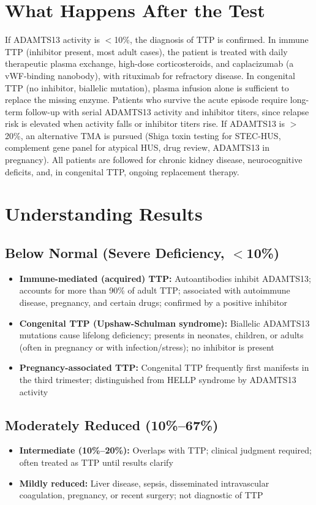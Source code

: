 \section*{What Happens After the Test}
If ADAMTS13 activity is $<$10\%, the diagnosis of TTP is confirmed. In immune TTP (inhibitor present, most adult cases), the patient is treated with daily therapeutic plasma exchange, high-dose corticosteroids, and caplacizumab (a vWF-binding nanobody), with rituximab for refractory disease. In congenital TTP (no inhibitor, biallelic mutation), plasma infusion alone is sufficient to replace the missing enzyme. Patients who survive the acute episode require long-term follow-up with serial ADAMTS13 activity and inhibitor titers, since relapse risk is elevated when activity falls or inhibitor titers rise. If ADAMTS13 is $>$20\%, an alternative TMA is pursued (Shiga toxin testing for STEC-HUS, complement gene panel for atypical HUS, drug review, ADAMTS13 in pregnancy). All patients are followed for chronic kidney disease, neurocognitive deficits, and, in congenital TTP, ongoing replacement therapy.

\section*{Understanding Results}

\subsection*{Below Normal (Severe Deficiency, $<$10\%)}
\begin{itemize}
  \item \textbf{Immune-mediated (acquired) TTP:} Autoantibodies inhibit ADAMTS13; accounts for more than 90\% of adult TTP; associated with autoimmune disease, pregnancy, and certain drugs; confirmed by a positive inhibitor
  \item \textbf{Congenital TTP (Upshaw-Schulman syndrome):} Biallelic ADAMTS13 mutations cause lifelong deficiency; presents in neonates, children, or adults (often in pregnancy or with infection/stress); no inhibitor is present
  \item \textbf{Pregnancy-associated TTP:} Congenital TTP frequently first manifests in the third trimester; distinguished from HELLP syndrome by ADAMTS13 activity
\end{itemize}

\subsection*{Moderately Reduced (10\%--67\%)}
\begin{itemize}
  \item \textbf{Intermediate (10\%--20\%):} Overlaps with TTP; clinical judgment required; often treated as TTP until results clarify
  \item \textbf{Mildly reduced:} Liver disease, sepsis, disseminated intravascular coagulation, pregnancy, or recent surgery; not diagnostic of TTP
\end{itemize}

